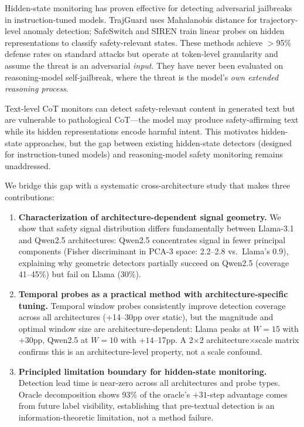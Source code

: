 \documentclass[11pt,a4paper]{article}
\begin{document}
Hidden-state monitoring has proven effective for detecting adversarial jailbreaks in instruction-tuned models.
TrajGuard \cite{xie2024trajguard} uses Mahalanobis distance for trajectory-level anomaly detection; SafeSwitch \cite{zheng2024safeswitch} and SIREN \cite{chen2024siren} train linear probes on hidden representations to classify safety-relevant states.
These methods achieve $>$95\% defense rates on standard attacks but operate at token-level granularity and assume the threat is an adversarial \emph{input}.
They have never been evaluated on reasoning-model self-jailbreak, where the threat is the model's \emph{own extended reasoning process}.

Text-level CoT monitors \cite{wang2024saferemind,zhong2024safethink} can detect safety-relevant content in generated text but are vulnerable to pathological CoT---the model may produce safety-affirming text while its hidden representations encode harmful intent.
This motivates hidden-state approaches, but the gap between existing hidden-state detectors (designed for instruction-tuned models) and reasoning-model safety monitoring remains unaddressed.

We bridge this gap with a systematic cross-architecture study that makes three contributions:

\begin{enumerate}
\item \textbf{Characterization of architecture-dependent signal geometry.}
We show that safety signal distribution differs fundamentally between Llama-3.1 and Qwen2.5 architectures: Qwen2.5 concentrates signal in fewer principal components (Fisher discriminant in PCA-3 space: 2.2--2.8 vs.\ Llama's 0.9), explaining why geometric detectors partially succeed on Qwen2.5 (coverage 41--45\%) but fail on Llama (30\%).

\item \textbf{Temporal probes as a practical method with architecture-specific tuning.}
Temporal window probes consistently improve detection coverage across all architectures (+14--30pp over static), but the magnitude and optimal window size are architecture-dependent: Llama peaks at $W{=}15$ with $+30$pp, Qwen2.5 at $W{=}10$ with $+14$--17pp.
A 2$\times$2 architecture$\times$scale matrix confirms this is an architecture-level property, not a scale confound.

\item \textbf{Principled limitation boundary for hidden-state monitoring.}
Detection lead time is near-zero across all architectures and probe types.
Oracle decomposition shows 93\% of the oracle's $+31$-step advantage comes from future label visibility, establishing that pre-textual detection is an information-theoretic limitation, not a method failure.
\end{enumerate}
\end{document}
